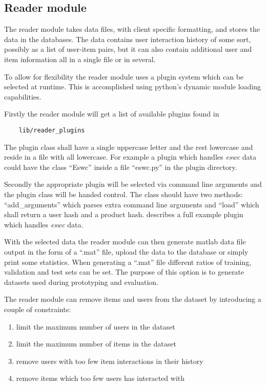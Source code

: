 
\subsection{Reader module}

The reader module takes data files, with client specific formatting, and stores the data in the databases. The data contains user interaction history of some sort, possibly as a list of user-item pairs, but it can also contain additional user and item information all in a single file or in several.

To allow for flexibility the reader module uses a plugin system which can be selected at runtime. This is accomplished using python's dynamic module loading capabilities.

Firstly the reader module will get a list of available plugins found in

\begin{lstlisting}
    lib/reader_plugins
\end{lstlisting}

The plugin class shall have a single uppercase letter and the rest lowercase and reside in a file with all lowercase. For example a plugin which handles \textit{eswc} data could have the class ``Eswc'' inside a file ``eswc.py'' in the plugin directory.

Secondly the appropriate plugin will be selected via command line arguments and the plugin class will be handed control. The class should have two methods: ``add\_arguments'' which parses extra command line arguments and ``load'' which shall return a user hash and a product hash.  describes a full example plugin which handles \textit{eswc} data.

With the selected data the reader module can then generate matlab data file output in the form of a ``.mat'' file, upload the data to the database or simply print some statistics. When generating a ``.mat'' file different ratios of training, validation and test sets can be set. The purpose of this option is to generate datasets used during prototyping and evaluation.

The reader module can remove items and users from the dataset by introducing a couple of constraints:

\begin{enumerate}
    \item limit the maximum number of users in the dataset
    \item limit the maximum number of items in the dataset
    \item remove users with too few item interactions in their history
    \item remove items which too few users has interacted with
\end{enumerate}

